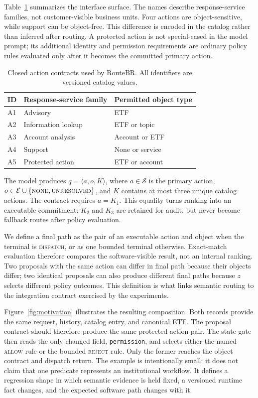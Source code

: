 \documentclass[10pt,conference,a4paper]{IEEEtran}
\newcommand{\method}{RouteBR}
\begin{document}
Table~\ref{tab:catalog} summarizes the interface surface. The names describe response-service families, not customer-visible business units. Four actions are object-sensitive, while support can be object-free. This difference is encoded in the catalog rather than inferred after routing. A protected action is not special-cased in the model prompt; its additional identity and permission requirements are ordinary policy rules evaluated only after it becomes the committed primary action.

\begin{table}[!b]
\caption{Closed action contracts used by \method. All identifiers are versioned catalog values.}
\label{tab:catalog}
\centering
\footnotesize
\setlength{\tabcolsep}{2.4pt}
\renewcommand{\arraystretch}{1.13}
\begin{tabular}{@{}lll@{}}
\toprule
ID & Response-service family & Permitted object type \\
\midrule
A1 & Advisory & ETF \\
A2 & Information lookup & ETF or topic \\
A3 & Account analysis & Account or ETF \\
A4 & Support & None or service \\
A5 & Protected action & ETF or account \\
\bottomrule
\end{tabular}
\end{table}

The model produces $q=\langle a,o,K\rangle$, where $a\in\mathcal{S}$ is the primary action, $o\in\mathcal{E}\cup\{\textsc{none},\textsc{unresolved}\}$, and $K$ contains at most three unique catalog actions. The contract requires $a=K_1$. This equality turns ranking into an executable commitment: $K_2$ and $K_3$ are retained for audit, but never become fallback routes after policy evaluation.

We define a final path as the pair of an executable action and object when the terminal is \textsc{dispatch}, or as one bounded terminal otherwise. Exact-match evaluation therefore compares the software-visible result, not an internal ranking. Two proposals with the same action can differ in final path because their objects differ; two identical proposals can also produce different final paths because $z$ selects different policy outcomes. This definition is what links semantic routing to the integration contract exercised by the experiments.

Figure~\ref{fig:motivation} illustrates the resulting composition. Both records provide the same request, history, catalog entry, and canonical ETF. The proposal contract should therefore produce the same protected-action pair. The state gate then reads the only changed field, \texttt{permission}, and selects either the named \textsc{allow} rule or the bounded \textsc{reject} rule. Only the former reaches the object contract and dispatch return. The example is intentionally small: it does not claim that one predicate represents an institutional workflow. It defines a regression shape in which semantic evidence is held fixed, a versioned runtime fact changes, and the expected software path changes with it.
\end{document}

